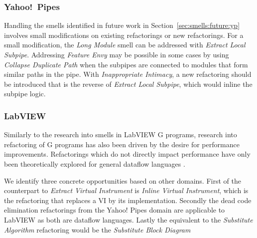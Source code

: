 \documentclass[10pt,conference,compsocconf]{IEEEtran}
\begin{document}
\subsubsection{Yahoo!\ Pipes}
Handling the smells identified in future work in Section~\ref{sec:smells:future:yp} involves small modifications on existing refactorings or new refactorings. For a small modification, the \emph{Long Module} smell can be addressed with \emph{Extract Local Subpipe}. 
Addressing \emph{Feature Envy} may be possible in some cases by using \emph{Collapse Duplicate Path} when the subpipes are connected to modules that form similar paths in the pipe.
With \emph{Inappropriate Intimacy}, a new refactoring should be introduced that is the reverse of \emph{Extract Local Subpipe}, which would inline the subpipe logic. 


\subsubsection{LabVIEW}

Similarly to the research into smells in LabVIEW G programs, research into refactoring of G programs has also been driven by the desire for performance improvements. Refactorings which do not directly impact performance have only been theoretically explored for general dataflow languages \cite{sui2008automated}.

We identify three concrete opportunities based on other domains.
First of the counterpart to \emph{Extract Virtual Instrument} is \emph{Inline Virtual Instrument}, which is the refactoring that replaces a VI by its implementation.
Secondly the dead code elimination refactorings from the Yahoo! Pipes domain are applicable to LabVIEW as both are dataflow languages.
Lastly the equivalent to the \emph{Substitute Algorithm} refactoring would be the \emph{Substitute Block Diagram}
\end{document}
